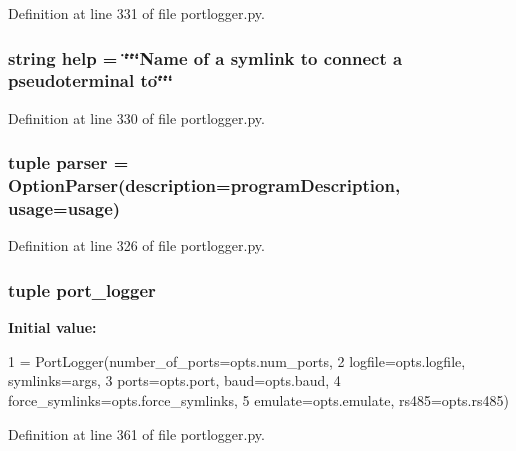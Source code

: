Definition at line 331 of file portlogger.\+py.

\subsubsection[{help}]{\setlength{\rightskip}{0pt plus 5cm}string help = \char`\"{}\char`\"{}\char`\"{}Name of {\bf a} symlink {\bf to} connect {\bf a} pseudoterminal {\bf to}\char`\"{}\char`\"{}\char`\"{}}\label{namespaceprotolibs_1_1portlogger_abcce2312b2278db095fe85eb2260cb84}


Definition at line 330 of file portlogger.\+py.

\subsubsection[{parser}]{\setlength{\rightskip}{0pt plus 5cm}tuple parser = Option\+Parser(description={\bf program\+Description}, {\bf usage}={\bf usage})}\label{namespaceprotolibs_1_1portlogger_a8842070e9da559035fb0c7cd5f8b3c6e}


Definition at line 326 of file portlogger.\+py.

\subsubsection[{port\+\_\+logger}]{\setlength{\rightskip}{0pt plus 5cm}tuple port\+\_\+logger}\label{namespaceprotolibs_1_1portlogger_a4db9321edceffdd061f4c2f4fec99622}
{\bfseries Initial value\+:}
\begin{DoxyCode}
1 = PortLogger(number\_of\_ports=opts.num\_ports, 
2                                  logfile=opts.logfile, symlinks=args,
3                                  ports=opts.port, baud=opts.baud,
4                                  force\_symlinks=opts.force\_symlinks,
5                                  emulate=opts.emulate, rs485=opts.rs485)
\end{DoxyCode}


Definition at line 361 of file portlogger.\+py.

